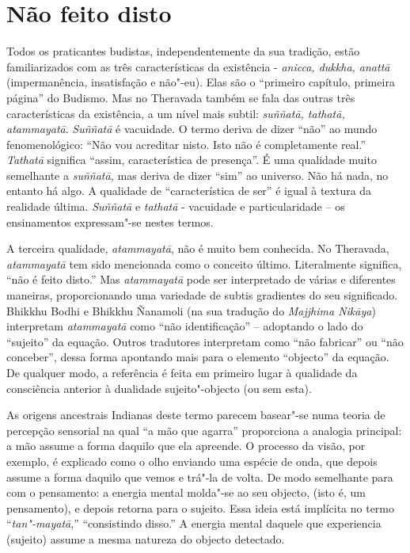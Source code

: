 \section{Não feito disto}

Todos os praticantes budistas, independentemente da sua tradição, estão
familiarizados com as três características da existência - \emph{anicca,
dukkha, anattā} (impermanência, insatisfação e não"-eu). Elas são o
``primeiro capítulo, primeira página'' do Budismo. Mas no Theravada
também se fala das outras três características da existência, a um nível
mais subtil: \emph{suññatā, tathatā, atammayatā}. \emph{Suññatā} é
vacuidade. O termo deriva de dizer ``não'' ao mundo fenomenológico:
``Não vou acreditar nisto. Isto não é completamente
real.'' \emph{Tathatā} significa ``assim, característica de presença''.
É uma qualidade muito semelhante a \emph{suññatā,}  mas deriva de dizer
``sim'' ao universo. Não há nada, no entanto há algo. A qualidade de
``característica de ser'' é igual à textura da realidade última.
\emph{Suññatā} e \emph{tathatā} - vacuidade e particularidade  -- os
ensinamentos expressam"-se nestes termos.

A terceira qualidade,   \emph{atammayatā}, não é muito bem conhecida. No
Theravada,  \emph{atammayatā} tem sido mencionada como o conceito
último. Literalmente significa, ``não é feito disto.'' Mas
\emph{atammayatā} pode ser interpretado de várias e diferentes maneiras,
proporcionando uma variedade de subtis gradientes do seu significado.
Bhikkhu Bodhi e Bhikkhu Ñanamoli (na sua tradução do \emph{Majjhima
Nikāya}) interpretam \emph{atammayatā}  como ``não identificação'' --
 adoptando o lado do ``sujeito'' da equação. Outros tradutores
interpretam como ``não fabricar'' ou ``não conceber'', dessa forma
apontando mais para o elemento ``objecto'' da equação. De qualquer modo,
a referência é feita em primeiro lugar à qualidade da consciência
anterior à dualidade sujeito"-objecto (ou sem esta). 

As origens ancestrais Indianas deste termo parecem basear"-se numa teoria
de percepção sensorial na qual ``a mão que agarra'' proporciona a
analogia principal: a mão assume a forma daquilo que ela apreende. O
processo da visão, por exemplo, é explicado como o olho enviando uma
espécie de onda, que depois assume a forma daquilo que vemos e trá"-la de
volta. De modo semelhante para com o pensamento: a energia mental
molda"-se ao seu objecto, (isto é, um pensamento), e depois retorna para
o sujeito. Essa ideia está implícita no termo ``\emph{tan"-mayatā},''
``consistindo disso.'' A energia mental daquele que experiencia
(sujeito) assume a mesma natureza do objecto detectado.

